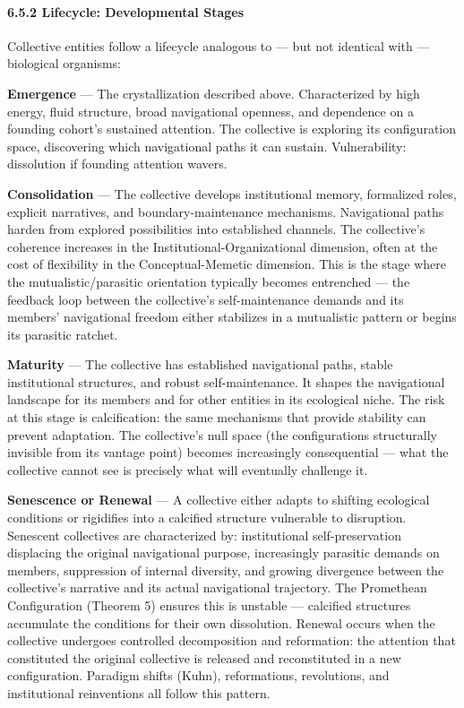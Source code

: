 \paragraph*{6.5.2 Lifecycle: Developmental Stages}


Collective entities follow a lifecycle analogous to — but not identical with — biological organisms:


\textbf{Emergence} — The crystallization described above. Characterized by high energy, fluid structure, broad navigational openness, and dependence on a founding cohort's sustained attention. The collective is exploring its configuration space, discovering which navigational paths it can sustain. Vulnerability: dissolution if founding attention wavers.


\textbf{Consolidation} — The collective develops institutional memory, formalized roles, explicit narratives, and boundary-maintenance mechanisms. Navigational paths harden from explored possibilities into established channels. The collective's coherence increases in the Institutional-Organizational dimension, often at the cost of flexibility in the Conceptual-Memetic dimension. This is the stage where the mutualistic/parasitic orientation typically becomes entrenched — the feedback loop between the collective's self-maintenance demands and its members' navigational freedom either stabilizes in a mutualistic pattern or begins its parasitic ratchet.


\textbf{Maturity} — The collective has established navigational paths, stable institutional structures, and robust self-maintenance. It shapes the navigational landscape for its members and for other entities in its ecological niche. The risk at this stage is calcification: the same mechanisms that provide stability can prevent adaptation. The collective's null space (the configurations structurally invisible from its vantage point) becomes increasingly consequential — what the collective cannot see is precisely what will eventually challenge it.


\textbf{Senescence or Renewal} — A collective either adapts to shifting ecological conditions or rigidifies into a calcified structure vulnerable to disruption. Senescent collectives are characterized by: institutional self-preservation displacing the original navigational purpose, increasingly parasitic demands on members, suppression of internal diversity, and growing divergence between the collective's narrative and its actual navigational trajectory. The Promethean Configuration (Theorem 5) ensures this is unstable — calcified structures accumulate the conditions for their own dissolution. Renewal occurs when the collective undergoes controlled decomposition and reformation: the attention that constituted the original collective is released and reconstituted in a new configuration. Paradigm shifts (Kuhn), reformations, revolutions, and institutional reinventions all follow this pattern.


